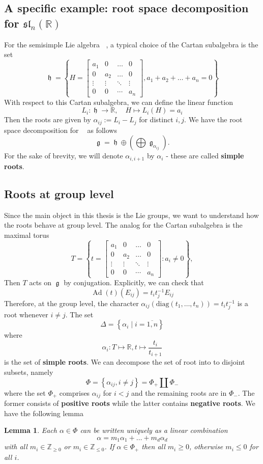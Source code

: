 \documentclass[12pt]{article} %
\newtheorem{lemma}[definition]{Lemma}
\DeclareMathOperator{\fg}{\mathfrak{g}}
\DeclareMathOperator{\fh}{\mathfrak{h}}
\DeclareMathOperator{\slnr}{\mathfrak{sl}_n(\mathbb{R})}
\DeclareMathOperator{\Ad}{\text{Ad}}
\begin{document}
\subsection{A specific example: root space decomposition for $\mathfrak{sl}_n(\mathbb{R})$}
For the semisimple Lie algebra $\slnr$, a typical choice of the Cartan subalgebra is the set
\[\fh = \left\lbrace H= \begin{bmatrix}
        a_1    & 0      & \ldots & 0      \\
        0      & a_2    & \ldots & 0      \\
        \vdots & \vdots & \ddots & \vdots \\
        0      & 0      & \cdots & a_n
    \end{bmatrix}, a_1 + a_2+ \ldots + a_n = 0\right\rbrace\]
With respect to this Cartan subalgebra, we can define the linear function
\[L_i \colon \fh \to \mathbb{R}, \quad H \mapsto L_i(H)= a_i\]
Then the roots are given by $\alpha_{ij} :=L_i - L_j$ for distinct $i,j$. We have the root space decomposition for $\slnr$ as follows
\[\fg = \fh \oplus \left(\bigoplus\fg_{\alpha_{ij}}\right).\]
For the sake of brevity, we will denote $\alpha_{i,i+1}$ by $\alpha_i$ - these are called \textbf{simple roots}.
\subsection{Roots at group level}
Since the main object in this thesis is the Lie groups, we want to understand how the roots
behave at group level. The analog for the Cartan subalgebra is the maximal torus
\[T = \left\lbrace t= \begin{bmatrix}
        a_1    & 0      & \ldots & 0      \\
        0      & a_2    & \ldots & 0      \\
        \vdots & \vdots & \ddots & \vdots \\
        0      & 0      & \cdots & a_n
    \end{bmatrix} :  a_i \ne 0\right\rbrace,\]
Then $T$ acts on $\fg$ by conjugation. Explicitly, we can check that
\[\Ad(t)(E_{ij}) = t_it_j^{-1}E_{ij}\]
Therefore, at the group level, the character $\alpha_{ij}(\text{diag}(t_1,\ldots,t_n))=t_it_j^{-1}$
is a root whenever $i \ne j$. The set
\[\Delta = \left\lbrace \alpha_i\mid i =\overline{1,n}\right\rbrace\]
where
\[\alpha_i \colon T \mapsto \mathbb{R}, t \mapsto \dfrac{t_i}{t_{i+1}}\]
is the set of \textbf{simple roots}.
We can decompose the set of root into to disjoint subsets, namely
\[\Phi = \left\lbrace \alpha_{ij}, i \ne j\right\rbrace = \Phi_+ \coprod \Phi_{-}\]
where the set $\Phi_+$ comprises $\alpha_{ij}$ for $i<j$ and the remaining roots are in $\Phi_{-}$. The former consists of
\textbf{positive roots} while the latter contains \textbf{negative roots}. We have the following lemma
\begin{lemma}\label{linear-comb-of-roots}
    Each $\alpha \in \Phi$ can be written uniquely as a linear combination
    \[\alpha = m_1\alpha_1+\ldots+m_{d}\alpha_{d}\]
    with all $m_i \in \mathbb{Z}_{\ge 0}$ or $m_i \in \mathbb{Z}_{\le 0}$. If $\alpha \in \Phi_+$ then all $m_i \ge 0$, otherwise $m_i \le 0$ for all $i$.
\end{lemma}
\end{document}
